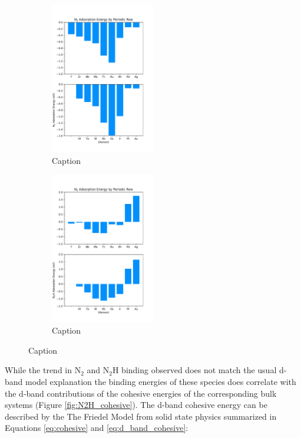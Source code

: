 \begin{figure}

\begin{subfigure}
    
    \centering
    \includegraphics[width=0.5\textwidth]{Images/N2_adsorption_rows.pdf}
    \caption{Caption}
    \label{fig:N2_rows}
\end{subfigure}

\begin{subfigure}
    \centering
    \includegraphics[width=0.5\textwidth]{Images/N2H_adsorption_rows.pdf}
    \caption{Caption}
    \label{fig:N2H_rows}
\end{subfigure}
\end{figure}

While the trend in N$_2$ and N$_2$H binding observed does not match the usual d-band model explanation the binding energies of these species does correlate with the d-band contributions of the cohesive energies of the corresponding bulk systems (Figure \ref{fig:N2H_cohesive}). The d-band cohesive energy can be described by the The Friedel Model \cite{1969TPom} from solid state physics summarized in Equations \ref{eq:cohesive} and \ref{eq:d_band_cohesive}:


